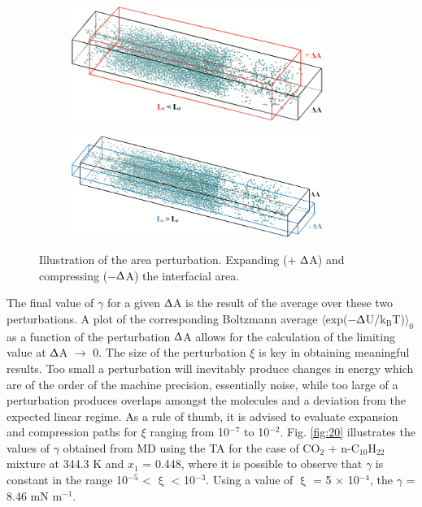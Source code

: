 \documentclass[9pt,tutorial]{livecoms}
\begin{document}
\begin{figure}
  \centering
	\begin{subfigure}{\linewidth} %
    \includegraphics[width=0.9\textwidth]{gfx/image64.png}
	\end{subfigure}
	\begin{subfigure}{\linewidth} %
    \includegraphics[width=0.9\textwidth]{gfx/image65.png}
	\end{subfigure}
\caption{Illustration of the area perturbation. Expanding (+ {${\Updelta}$}A) and compressing (${-}${${\Updelta}$}A) the interfacial area.}
\label{fig:19}
\end{figure}

The final value of {${\gamma}$} for a given {\textbar}{${\Updelta}$}A{\textbar}
is the result of the average over these two perturbations. A plot of the
corresponding Boltzmann average
${\langle}$exp(${-}${${\Updelta}$}U/k$_{\mathrm{B}}$T)${\rangle}_{0}$ as
a function of the perturbation {\textbar}{${\Updelta}$}A{\textbar} allows for
the calculation of the limiting value at {${\Updelta}$}A ${\rightarrow}$ 0. The
size of the perturbation {${\xi}$} is key in obtaining meaningful results. Too
small a perturbation will inevitably produce changes in energy which are of the
order of the machine precision, essentially noise, while too large of
a perturbation produces overlaps amongst the molecules and a deviation from the
expected linear regime. As a rule of thumb, it is advised to evaluate expansion
and compression paths for {${\xi}$} ranging from 10$^{{-}7}$ to 10$^{{-}2}$.
Fig. \ref{fig:20} illustrates the values of {${\gamma}$} obtained from MD using the TA
for the case of CO$_{2}$ + n-C$_{10}$H$_{22}$ mixture at 344.3 K and
$x_{1}$ = 0.448, where it is possible to observe that {${\gamma}$} is
constant in the range 10$^{-5}$ {\textless} {${\upxi}$} {\textless} 10$^{-3}$.
Using a value of {${\upxi}$} = 5 ${\times}$ 10$^{-4}$, the {${\gamma}$} = 8.46
mN m$^{-1}$.\citep{muller2009} 
\end{document}
